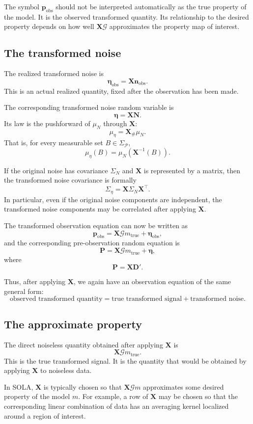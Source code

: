 \documentclass[11pt]{article}
\newcommand{\SigmaP}{\Sigma_{\mathcal P}}
\newcommand{\muN}{\mu_N}
\newcommand{\Dobsrand}{\mathbf D'}
\newcommand{\Nrand}{\mathbf N}
\newcommand{\Prand}{\mathbf P}
\newcommand{\nobs}{\mathbf n_{\mathrm{obs}}}
\newcommand{\pobs}{\mathbf p_{\mathrm{obs}}}
\newcommand{\G}{\mathcal G}
\newcommand{\X}{\mathbf X}
\newcommand{\etarand}{\boldsymbol{\eta}}
\newcommand{\mueta}{\mu_{\eta}}
\begin{document}
The symbol \(\pobs\) should not be interpreted automatically as the true property of the model. It is the observed transformed quantity. Its relationship to the desired property depends on how well \(\X\G\) approximates the property map of interest.

\subsection{The transformed noise}

The realized transformed noise is
\[
    \etarand_{\mathrm{obs}}
    =
    \X\nobs.
\]
This is an actual realized quantity, fixed after the observation has been made.

The corresponding transformed noise random variable is
\[
    \etarand
    =
    \X\Nrand.
\]
Its law is the pushforward of \(\muN\) through \(\X\):
\[
    \mueta
    =
    \X_{\#}\muN.
\]
That is, for every measurable set \(B\in\SigmaP\),
\[
    \mueta(B)
    =
    \muN(\X^{-1}(B)).
\]

If the original noise has covariance \(\Sigma_N\) and \(\X\) is represented by a matrix, then the transformed noise covariance is formally
\[
    \Sigma_{\eta}
    =
    \X\Sigma_N\X^{\top}.
\]
In particular, even if the original noise components are independent, the transformed noise components may be correlated after applying \(\X\).

The transformed observation equation can now be written as
\[
    \pobs
    =
    \X\G m_{\mathrm{true}}
    +
    \etarand_{\mathrm{obs}},
\]
and the corresponding pre-observation random equation is
\[
    \Prand
    =
    \X\G m_{\mathrm{true}}
    +
    \etarand,
\]
where
\[
    \Prand=\X\Dobsrand.
\]

Thus, after applying \(\X\), we again have an observation equation of the same general form:
\[
    \text{observed transformed quantity}
    =
    \text{true transformed signal}
    +
    \text{transformed noise}.
\]

\subsection{The approximate property}

The direct noiseless quantity obtained after applying \(\X\) is
\[
    \X\G m_{\mathrm{true}}.
\]
This is the true transformed signal. It is the quantity that would be obtained by applying \(\X\) to noiseless data.

In SOLA, \(\X\) is typically chosen so that \(\X\G m\) approximates some desired property of the model \(m\). For example, a row of \(\X\) may be chosen so that the corresponding linear combination of data has an averaging kernel localized around a region of interest.
\end{document}
